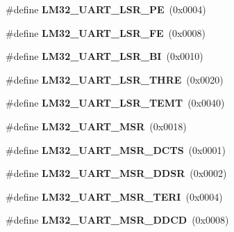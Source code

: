 \begin{DoxyCompactItemize}
\mbox{\label{group__lm32__uart_gac9ec5a3f2f725148db535d942b77e8c3}} 
\#define {\bfseries L\+M32\+\_\+\+U\+A\+R\+T\+\_\+\+L\+S\+R\+\_\+\+PE}~(0x0004)
\item 
\mbox{\label{group__lm32__uart_ga8c58e4c246b935e4c5824540058fe1e3}} 
\#define {\bfseries L\+M32\+\_\+\+U\+A\+R\+T\+\_\+\+L\+S\+R\+\_\+\+FE}~(0x0008)
\item 
\mbox{\label{group__lm32__uart_ga85e89e7cd710e7c464a4847e9e35b953}} 
\#define {\bfseries L\+M32\+\_\+\+U\+A\+R\+T\+\_\+\+L\+S\+R\+\_\+\+BI}~(0x0010)
\item 
\mbox{\label{group__lm32__uart_ga2105f246a655c7178dfb13e752debe8f}} 
\#define {\bfseries L\+M32\+\_\+\+U\+A\+R\+T\+\_\+\+L\+S\+R\+\_\+\+T\+H\+RE}~(0x0020)
\item 
\mbox{\label{group__lm32__uart_ga4d84fa974e4010cac11c58d0213bc551}} 
\#define {\bfseries L\+M32\+\_\+\+U\+A\+R\+T\+\_\+\+L\+S\+R\+\_\+\+T\+E\+MT}~(0x0040)
\item 
\mbox{\label{group__lm32__uart_gabecb7f66089f1c7290b302136982725f}} 
\#define {\bfseries L\+M32\+\_\+\+U\+A\+R\+T\+\_\+\+M\+SR}~(0x0018)
\item 
\mbox{\label{group__lm32__uart_ga03cea894be933b98279bd7a6ba24af9a}} 
\#define {\bfseries L\+M32\+\_\+\+U\+A\+R\+T\+\_\+\+M\+S\+R\+\_\+\+D\+C\+TS}~(0x0001)
\item 
\mbox{\label{group__lm32__uart_gae1473622345458ff1c4cab572b3a498f}} 
\#define {\bfseries L\+M32\+\_\+\+U\+A\+R\+T\+\_\+\+M\+S\+R\+\_\+\+D\+D\+SR}~(0x0002)
\item 
\mbox{\label{group__lm32__uart_gae255a2582cd3cf8248ad17b4531b1afd}} 
\#define {\bfseries L\+M32\+\_\+\+U\+A\+R\+T\+\_\+\+M\+S\+R\+\_\+\+T\+E\+RI}~(0x0004)
\item 
\mbox{\label{group__lm32__uart_gacfd96cd6c6cfa0705e5e7cb486411cbe}} 
\#define {\bfseries L\+M32\+\_\+\+U\+A\+R\+T\+\_\+\+M\+S\+R\+\_\+\+D\+D\+CD}~(0x0008)
\item 

\end{DoxyCompactItemize}

